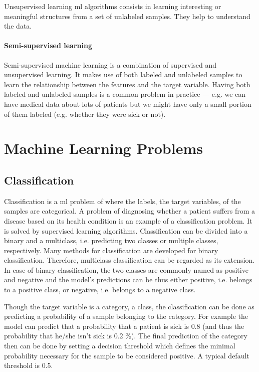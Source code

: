 Unsupervised learning \acrshort{ml} algorithms consists in learning interesting or meaningful structures from a set of unlabeled samples.
They help to understand the data.

\paragraph{Semi-supervised learning}

Semi-supervised machine learning is a combination of supervised and unsupervised learning.
It makes use of both labeled and unlabeled samples to learn the relationship between the features and the target variable.
Having both labeled and unlabeled samples is a common problem in practice --- e.g. we can have medical data about lots of patients but we might have only a small portion of them labeled (e.g. whether they were sick or not).

\section{Machine Learning Problems}
\label{sec:ml_problems}

\subsection{Classification}

Classification is a \acrshort{ml} problem of where the labels, the target variables, of the samples are categorical.
A problem of diagnosing whether a patient suffers from a disease based on its health condition is an example of a classification problem.
It is solved by supervised learning algorithms.
Classification can be divided into a binary and a multiclass, i.e. predicting two classes or multiple classes, respectively.
Many methods for classification are developed for binary classification.
Therefore, multiclass classification can be regarded as its extension.
In case of binary classification, the two classes are commonly named as positive and negative and the model's predictions can be thus either positive, i.e. belongs to a positive class, or negative, i.e. belongs to a negative class.

Though the target variable is a category, a class, the classification can be done as predicting a probability of a sample belonging to the category.
For example the model can predict that a probability that a patient is sick is 0.8 (and thus the probability that he/she isn't sick is 0.2 \%).
The final prediction of the category then can be done by setting a decision threshold which defines the minimal probability necessary for the sample to be considered positive.
A typical default threshold is 0.5.

